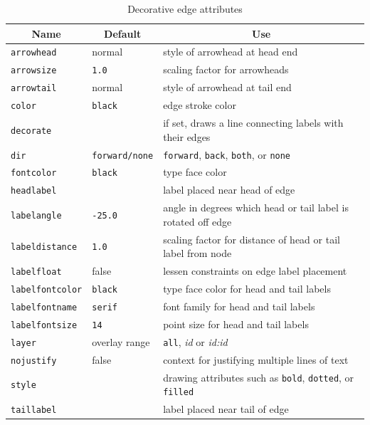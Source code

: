 \begin{table}[htbp]\footnotesize
\centering
\begin{tabular}[t]{|l|l|p{2.5in}|} \hline
\multicolumn{1}{|c|}{Name} & \multicolumn{1}{c|}{Default} & \multicolumn{1}{c|}{Use} \\ \hline
{\tt arrowhead} & normal & style of arrowhead at head end \\
{\tt arrowsize} & {\tt 1.0} & scaling factor for arrowheads \\
{\tt arrowtail} & normal & style of arrowhead at tail end \\
{\tt color} & {\tt black} & edge stroke color \\
{\tt decorate} & & if set, draws a line connecting labels with their edges \\
{\tt dir} & {\tt forward/none} & {\tt forward}, {\tt back}, {\tt both}, or {\tt none} \\ 
{\tt fontcolor} & {\tt black} & type face color \\
{\tt headlabel} & & label placed near head of edge \\
{\tt labelangle} & {\tt -25.0} & angle in degrees which head or tail label
is rotated off edge \\
{\tt labeldistance} & {\tt 1.0} & scaling factor for distance of head or tail label from node \\
{\tt labelfloat} & false & lessen constraints on edge label placement \\
{\tt labelfontcolor} & {\tt black} & type face color for head and tail labels\\
{\tt labelfontname} & {\tt serif} & font family for head and tail labels\\
{\tt labelfontsize} & {\tt 14} & point size for head and tail labels \\
{\tt layer} & overlay range & {\tt all}, {\it id} or {\it id:id} \\
{\tt nojustify} & false & context for justifying multiple lines of text \\
{\tt style} & & drawing attributes such as {\tt bold}, {\tt dotted}, or {\tt filled} \\ 
{\tt taillabel} & & label placed near tail of edge \\
\hline
\end{tabular}
\caption{Decorative edge attributes}
\label{tab:eattr_dec}
\end{table}
